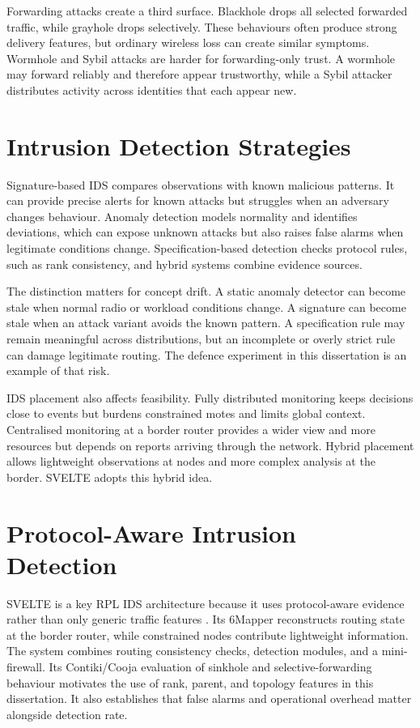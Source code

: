Forwarding attacks create a third surface. Blackhole drops all selected forwarded traffic, while grayhole drops selectively. These behaviours often produce strong delivery features, but ordinary wireless loss can create similar symptoms. Wormhole and Sybil attacks are harder for forwarding-only trust. A wormhole may forward reliably and therefore appear trustworthy, while a Sybil attacker distributes activity across identities that each appear new.

\section{Intrusion Detection Strategies}

Signature-based IDS compares observations with known malicious patterns. It can provide precise alerts for known attacks but struggles when an adversary changes behaviour. Anomaly detection models normality and identifies deviations, which can expose unknown attacks but also raises false alarms when legitimate conditions change. Specification-based detection checks protocol rules, such as rank consistency, and hybrid systems combine evidence sources.

The distinction matters for concept drift. A static anomaly detector can become stale when normal radio or workload conditions change. A signature can become stale when an attack variant avoids the known pattern. A specification rule may remain meaningful across distributions, but an incomplete or overly strict rule can damage legitimate routing. The defence experiment in this dissertation is an example of that risk.

IDS placement also affects feasibility. Fully distributed monitoring keeps decisions close to events but burdens constrained motes and limits global context. Centralised monitoring at a border router provides a wider view and more resources but depends on reports arriving through the network. Hybrid placement allows lightweight observations at nodes and more complex analysis at the border. SVELTE adopts this hybrid idea.

\section{Protocol-Aware Intrusion Detection}

SVELTE is a key RPL IDS architecture because it uses protocol-aware evidence rather than only generic traffic features \cite{svelte2013}. Its 6Mapper reconstructs routing state at the border router, while constrained nodes contribute lightweight information. The system combines routing consistency checks, detection modules, and a mini-firewall. Its Contiki/Cooja evaluation of sinkhole and selective-forwarding behaviour motivates the use of rank, parent, and topology features in this dissertation. It also establishes that false alarms and operational overhead matter alongside detection rate.

